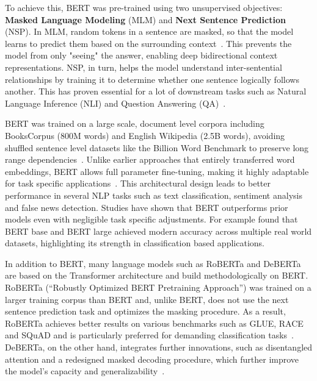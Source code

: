 To achieve this, BERT was pre-trained using two unsupervised objectives: \textbf{Masked Language Modeling} (MLM) and \textbf{Next Sentence Prediction} (NSP). In MLM, random tokens in a sentence are masked, so that the model learns to predict them based on the surrounding context~\parencite{devlin2019bert}. This prevents the model from only "seeing" the answer, enabling deep bidirectional context representations. NSP, in turn, helps the model understand inter-sentential relationships by training it to determine whether one sentence logically follows another. This has proven essential for a lot of downstream tasks such as Natural Language Inference (NLI) and Question Answering (QA)~\parencite{sun2020finetuneberttextclassification}.

BERT was trained on a large scale, document level corpora including BooksCorpus (800M words) and English Wikipedia (2.5B words), avoiding shuffled sentence level datasets like the Billion Word Benchmark to preserve long range dependencies~\parencite{sun2020finetuneberttextclassification}. Unlike earlier approaches that entirely transferred word embeddings, BERT allows full parameter fine-tuning, making it highly adaptable for task specific applications~\parencite{korootev2021BERT}. This architectural design leads to better performance in several NLP tasks such as text classification, sentiment analysis and false news detection. Studies have shown that BERT outperforms prior models even with negligible task specific adjustments. For example \textcite{qasim2022fine} found that BERT base and BERT large achieved modern accuracy across multiple real world datasets, highlighting its strength in classification based applications.

In addition to BERT, many language models such as RoBERTa \parencite{liu2019roberta} and DeBERTa \parencite{he2021deberta} are based on the Transformer architecture and build methodologically on BERT. RoBERTa (“Robustly Optimized BERT Pretraining Approach”) was trained on a larger training corpus than BERT and, unlike BERT, does not use the next sentence prediction task and optimizes the masking procedure. As a result, RoBERTa achieves better results on various benchmarks such as GLUE, RACE and SQuAD and is particularly preferred for demanding classification tasks~\parencite{liu2019roberta}. DeBERTa, on the other hand, integrates further innovations, such as disentangled attention and a redesigned masked decoding procedure, which further improve the model's capacity and generalizability~\parencite{he2021deberta, he2023debertav3}.



